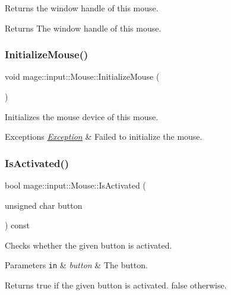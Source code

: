 Returns the window handle of this mouse.

\begin{DoxyReturn}{Returns}
The window handle of this mouse. 
\end{DoxyReturn}
\mbox{\label{classmage_1_1input_1_1_mouse_a8209bbaf255c2e93ee1cd8f3937cd8ab}} 
\subsubsection{\texorpdfstring{Initialize\+Mouse()}{InitializeMouse()}}
{\footnotesize\ttfamily void mage\+::input\+::\+Mouse\+::\+Initialize\+Mouse (\begin{DoxyParamCaption}{ }\end{DoxyParamCaption})\hspace{0.3cm}{\ttfamily [private]}}

Initializes the mouse device of this mouse.


\begin{DoxyExceptions}{Exceptions}
{\em \mbox{\hyperlink{classmage_1_1_exception}{Exception}}} & Failed to initialize the mouse. \\
\hline
\end{DoxyExceptions}
\mbox{\label{classmage_1_1input_1_1_mouse_abc5d4a21e21865202c01993fc093977f}} 
\subsubsection{\texorpdfstring{Is\+Activated()}{IsActivated()}}
{\footnotesize\ttfamily bool mage\+::input\+::\+Mouse\+::\+Is\+Activated (\begin{DoxyParamCaption}\item[{unsigned char}]{button }\end{DoxyParamCaption}) const\hspace{0.3cm}{\ttfamily [noexcept]}}

Checks whether the given button is activated.


\begin{DoxyParams}[1]{Parameters}
\mbox{\tt in}  & {\em button} & The button. \\
\hline
\end{DoxyParams}
\begin{DoxyReturn}{Returns}
{\ttfamily true} if the given button is activated. {\ttfamily false} otherwise. 
\end{DoxyReturn}
\mbox{\label{classmage_1_1input_1_1_mouse_ac26bb38af310da51fadba94fac850fbe}} 
